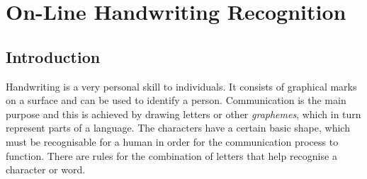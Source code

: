 ﻿%

\chapter{On-Line Handwriting Recognition}
\label{chap:onlinehwr}



\section{Introduction}
\label{sec:onlinehwrintroduction}




Handwriting is a very personal skill to individuals. It consists of graphical
marks on a surface and can be used to identify a person. 
Communication is the main purpose and this is achieved by drawing letters 
or other \emph{graphemes}, which in turn represent parts of a language.
The characters have a certain basic shape, which must be recognisable
for a human in order for the communication process to function.
There are rules for the combination of letters that help recognise a character 
or word.

